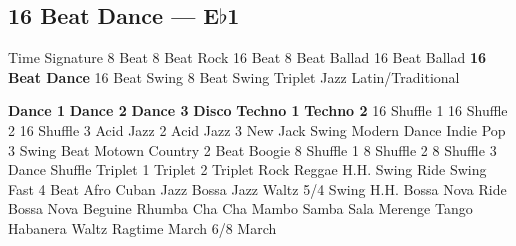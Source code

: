 \subsection{16 Beat Dance --- E$\flat$1}
Time Signature
8 Beat
8 Beat Rock
16 Beat
8 Beat Ballad
16 Beat Ballad
\textbf{16 Beat Dance}
16 Beat Swing
8 Beat Swing
Triplet
Jazz
Latin/Traditional





























\textbf{Dance 1}
\textbf{Dance 2}
\textbf{Dance 3}
\textbf{Disco}
\textbf{Techno 1}
\textbf{Techno 2}
16 Shuffle 1
16 Shuffle 2
16 Shuffle 3
Acid Jazz 2
Acid Jazz 3
New Jack Swing
Modern Dance
Indie Pop 3
Swing Beat
Motown
Country 2 Beat
Boogie
8 Shuffle 1
8 Shuffle 2
8 Shuffle 3
Dance Shuffle
Triplet 1
Triplet 2
Triplet Rock
Reggae
H.H. Swing
Ride Swing
Fast 4 Beat
Afro Cuban
Jazz Bossa
Jazz Waltz
5/4 Swing
H.H. Bossa Nova
Ride Bossa Nova
Beguine
Rhumba
Cha Cha
Mambo
Samba
Sala
Merenge
Tango
Habanera
Waltz
Ragtime
March
6/8 March
